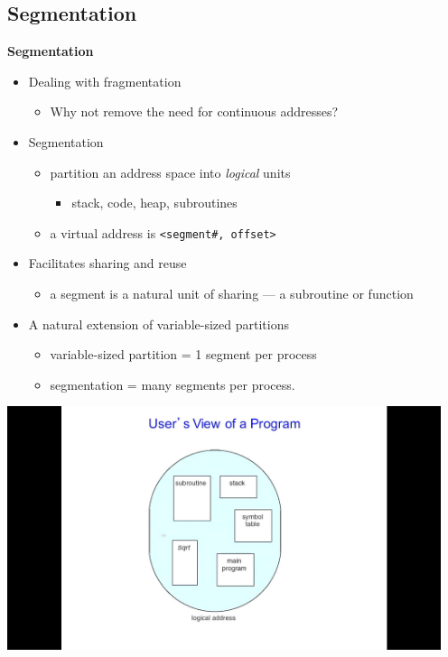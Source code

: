 \documentclass[11pt,a4paper]{article}
\begin{document}
\subsection{Segmentation}

\textbf{Segmentation}
\begin{itemize}
    \item Dealing with fragmentation
        \begin{itemize}
            \item Why not remove the need for continuous addresses?
        \end{itemize}
    \item Segmentation
        \begin{itemize}
            \item partition an address space into \emph{logical} units
                \begin{itemize}
                    \item stack, code, heap, subroutines
                \end{itemize}
            \item a virtual address is \texttt{<segment\#, offset>}
        \end{itemize}
    \item Facilitates sharing and reuse
        \begin{itemize}
            \item a segment is a natural unit of sharing --- a subroutine or function
        \end{itemize}
    \item A natural extension of variable-sized partitions
        \begin{itemize}
            \item variable-sized partition = 1 segment per process
            \item segmentation = many segments per process.
        \end{itemize}
\end{itemize}

\includegraphics[height=270]{users-view-of-a-program.jpg}
\end{document}
